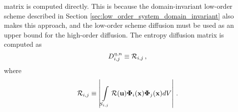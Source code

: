 matrix is computed directly. This is because the domain-invariant low-order scheme
described in Section \ref{sec:low_order_system_domain_invariant} also makes
this approach, and the low-order scheme diffusion must be used as an upper bound
for the high-order diffusion. The entropy diffusion matrix is computed as
\begin{equation}
  D^{\eta,n}_{i,j} \equiv
    \mathcal{R}_{i,j}
  \,,
\end{equation}
where
\begin{equation}
  \mathcal{R}_{i,j} \equiv \left|
    \int\limits_{S_{i,j}}\mathcal{R}(\mathbf{u})
      \mathbf{\Phi}_i(\mathbf{x})\mathbf{\Phi}_j(\mathbf{x}) dV
    \right|
  \,.
\end{equation}


